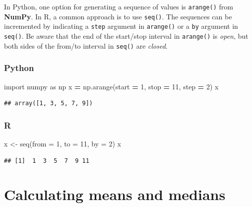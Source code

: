 \documentclass[
]{book}
\newenvironment{Shaded}{\begin{snugshade}}{\end{snugshade}}
\newcommand{\AttributeTok}[1]{\textcolor[rgb]{0.77,0.63,0.00}{#1}}
\newcommand{\DecValTok}[1]{\textcolor[rgb]{0.00,0.00,0.81}{#1}}
\newcommand{\FunctionTok}[1]{\textcolor[rgb]{0.00,0.00,0.00}{#1}}
\newcommand{\ImportTok}[1]{#1}
\newcommand{\NormalTok}[1]{#1}
\newcommand{\OperatorTok}[1]{\textcolor[rgb]{0.81,0.36,0.00}{\textbf{#1}}}
\newcommand{\OtherTok}[1]{\textcolor[rgb]{0.56,0.35,0.01}{#1}}
\begin{document}
In Python, one option for generating a sequence of values is \texttt{arange()} from \textbf{NumPy}. In R, a common approach is to use \texttt{seq()}. The sequences can be incremented by indicating a \texttt{step} argument in \texttt{arange()} or a \texttt{by} argument in \texttt{seq()}. Be aware that the end of the start/stop interval in \texttt{arange()} is \emph{open}, but both sides of the from/to interval in \texttt{seq()} are \emph{closed}.

\hypertarget{python-5}{%
\subsubsection*{Python}\label{python-5}}

\begin{Shaded}
\begin{Highlighting}[]
\ImportTok{import}\NormalTok{ numpy }\ImportTok{as}\NormalTok{ np}
\NormalTok{x }\OperatorTok{=}\NormalTok{ np.arange(start }\OperatorTok{=} \DecValTok{1}\NormalTok{, stop }\OperatorTok{=} \DecValTok{11}\NormalTok{, step }\OperatorTok{=} \DecValTok{2}\NormalTok{)}
\NormalTok{x}
\end{Highlighting}
\end{Shaded}

\begin{verbatim}
## array([1, 3, 5, 7, 9])
\end{verbatim}

\hypertarget{r-5}{%
\subsubsection*{R}\label{r-5}}

\begin{Shaded}
\begin{Highlighting}[]
\NormalTok{x }\OtherTok{\textless{}{-}} \FunctionTok{seq}\NormalTok{(}\AttributeTok{from =} \DecValTok{1}\NormalTok{, }\AttributeTok{to =} \DecValTok{11}\NormalTok{, }\AttributeTok{by =} \DecValTok{2}\NormalTok{)}
\NormalTok{x}
\end{Highlighting}
\end{Shaded}

\begin{verbatim}
## [1]  1  3  5  7  9 11
\end{verbatim}

\hypertarget{calculating-means-and-medians}{%
\section{Calculating means and medians}\label{calculating-means-and-medians}}
\end{document}
